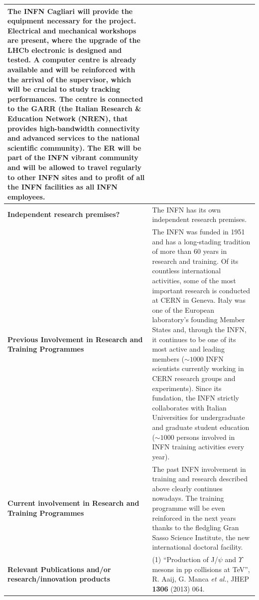 \documentclass[a4paper,11pt]{article}
\newcommand{\ER}{ER\xspace}
\begin{document}
{\begin{tabular}{>{\raggedright}p{}p{}}
The INFN Cagliari will provide the equipment necessary for the 
project. 
Electrical and mechanical workshops are present, where 
the upgrade of the LHCb electronic is designed and tested.
A computer centre is already available and 
will be reinforced with the arrival of the supervisor,
which will be crucial to study tracking performances.
The centre is connected  to
the GARR (the Italian Research \& Education Network (NREN), that
provides high-bandwidth connectivity and advanced services to the
national scientific community).
The \ER will be part of the INFN vibrant community and 
will be allowed to travel regularly to other INFN sites and 
to profit of all the INFN facilities as all INFN 
employees.
\\\midrule
\textbf{Independent research premises?} & The INFN has its own independent research premises.
\\\midrule
\textbf{Previous Involvement in Research and Training Programmes} &
The INFN was funded in 1951 and has a long-stading tradition of
more than 60 years in research and training. Of its countless
international activities, some of the most important research is
conducted at CERN in Geneva. Italy was one of the European
laboratory’s founding Member States and, through the INFN, it
continues to be one of its most active and leading members ($\sim 1000$
INFN scientists currently working in CERN research groups and
experiments). Since its fundation, the INFN strictly collaborates with
Italian Universities for undergraduate and graduate student education
($\sim 1000$ persons involved in INFN training activities every year).
\\\midrule
\textbf{Current involvement in Research and Training Programmes} &
The past INFN involvement in training and research described above
clearly continues nowadays. The training programme will be even
reinforced in the next years thanks to the fledgling Gran Sasso
Science Institute, the new international doctoral facility.
\\\midrule
\textbf{Relevant Publications and/or research/innovation products} &
(1) “Production of J/$\psi$ and $\Upsilon$ mesons in pp collisions at \sqrtsnn=8 TeV”, R. Aaij, G. Manca {\it et al.}, JHEP {\bf 1306} (2013) 064.


\end{tabular}}
\end{document}
